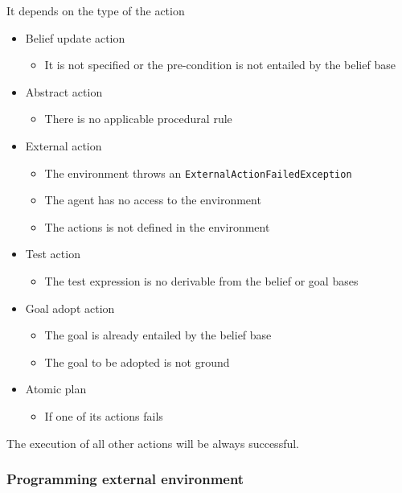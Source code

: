 \documentclass[dvipsnames,usenames,10pt]{beamer}
\begin{document}
\begin{frame}
	It depends on the type of the action
	\begin{itemize}
		\item Belief update action
			\begin{itemize}
				\item  It is not specified or the pre-condition is not entailed by the belief base
			\end{itemize}
		\item Abstract action
			\begin{itemize}
				\item There is no applicable procedural rule 
			\end{itemize}
		\item External action
			\begin{itemize}
				\item The environment throws an \texttt{ExternalActionFailedException}
				\item The agent has no access to the environment
				\item The actions is not defined in the environment
			\end{itemize}
		\item Test action 
			\begin{itemize}
				\item The test expression is no derivable from the belief or goal bases
			\end{itemize}
		\item Goal adopt action
			\begin{itemize}
				\item The goal is already entailed by the belief base
				\item The goal to be adopted is not ground
			\end{itemize}
		\item Atomic plan
			\begin{itemize}
				\item If one of its actions fails
			\end{itemize}
	\end{itemize}

	The execution of all other actions will be always successful.
	
\end{frame}

\subsubsection{Programming external environment}
\end{document}

